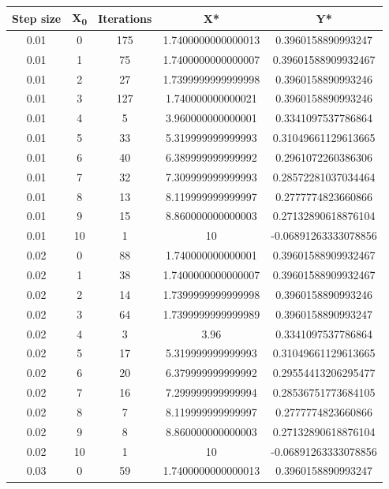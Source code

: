 \documentclass[paper=a4, fontsize=11pt]{scrartcl} %
\numberwithin{equation}{section} %
\numberwithin{figure}{section} %
\numberwithin{table}{section} %
\begin{document}
\begin{center}
\begin{tabular}{ |c|c|c|c|c| } 
	\hline
	\textbf{Step size} & \textbf{X\textsubscript{0}} & \textbf{Iterations} & \textbf{X*} & \textbf{Y*} \\ 
	\hline
    0.01 & 0 & 175 & 1.7400000000000013 & 0.3960158890993247 \\
    0.01 & 1 & 75 & 1.7400000000000007 & 0.39601588909932467 \\
    0.01 & 2 & 27 & 1.7399999999999998 & 0.3960158890993246 \\
    0.01 & 3 & 127 & 1.740000000000021 & 0.3960158890993246 \\
    0.01 & 4 & 5 & 3.960000000000001 & 0.3341097537786864 \\
    0.01 & 5 & 33 & 5.319999999999993 & 0.31049661129613665 \\
    0.01 & 6 & 40 & 6.389999999999992 & 0.2961072260386306 \\
    0.01 & 7 & 32 & 7.309999999999993 & 0.28572281037034464 \\
    0.01 & 8 & 13 & 8.119999999999997 & 0.2777774823660866 \\
    0.01 & 9 & 15 & 8.860000000000003 & 0.27132890618876104 \\
    0.01 & 10 & 1 & 10 & -0.06891263333078856 \\
    0.02 & 0 & 88 & 1.740000000000001 & 0.39601588909932467 \\
    0.02 & 1 & 38 & 1.7400000000000007 & 0.39601588909932467 \\
    0.02 & 2 & 14 & 1.7399999999999998 & 0.3960158890993246 \\
    0.02 & 3 & 64 & 1.7399999999999989 & 0.3960158890993247 \\
    0.02 & 4 & 3 & 3.96 & 0.3341097537786864 \\
    0.02 & 5 & 17 & 5.319999999999993 & 0.31049661129613665 \\
    0.02 & 6 & 20 & 6.379999999999992 & 0.29554413206295477 \\
    0.02 & 7 & 16 & 7.299999999999994 & 0.28536751773684105 \\
    0.02 & 8 & 7 & 8.119999999999997 & 0.2777774823660866 \\
    0.02 & 9 & 8 & 8.860000000000003 & 0.27132890618876104 \\
    0.02 & 10 & 1 & 10 & -0.06891263333078856 \\
    0.03 & 0 & 59 & 1.7400000000000013 & 0.3960158890993247 \\

\end{tabular}
\end{center}
\end{document}
